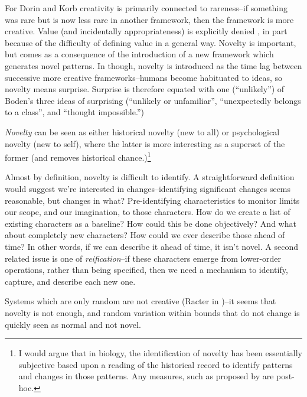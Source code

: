 \begin{NOTES}
\begin{mdframed}[style=box, frametitle={Creativity, and its relationship to Novelty, Surprise, and Value}]
For Dorin and Korb \cite{Dorin2009} creativity is primarily connected to rareness--if something was rare but is now less rare in another framework, then the framework is more creative. Value (and incidentally appropriateness) is explicitly denied \cite[p.18]{Dorin2009}, in part because of the difficulty of defining value in a general way. Novelty is important, but comes as a consequence of the introduction of a new framework which generates novel patterns. In \cite[p.16]{Dorin2009} though, novelty is introduced as the time lag between successive more creative frameworks--humans become habituated to ideas, so novelty means surprise. Surprise is therefore equated with one (``unlikely'') of Boden's three ideas of surprising (``unlikely or unfamiliar'', ``unexpectedly belongs to a class'', and ``thought impossible.'')

\emph{Novelty} can be seen as either historical novelty (new to all) or psychological novelty (new to self), where the latter is more interesting as a superset of the former (and removes historical chance.)\footnote{I would argue that in biology, the identification of novelty has been essentially subjective based upon a reading of the historical record to identify patterns and changes in those patterns. Any measures, such as proposed by \cite{McShea1998,Maynard-Smith:1995lw,Walker2012} are post-hoc.}

Almost by definition, novelty is difficult to identify. A straightforward definition would suggest we're interested in changes--identifying significant changes seems reasonable, but changes in what? Pre-identifying characteristics to monitor limits our scope, and our imagination, to those characters. How do we create a list of existing characters as a baseline? How could this be done objectively? And what about completely new characters? How could we ever describe those ahead of time? In other words, if we can describe it ahead of time, it isn't novel. A second related issue is one of \textit{reification}--if these characters emerge from lower-order operations, rather than being specified, then we need a mechanism to identify, capture, and describe each new one.

Systems which are only random are not creative (\eg Racter in \cite[p.16]{Dorin2009})--it seems that novelty is not enough, and random variation within bounds that do not change is quickly seen as normal and not novel. 


\end{mdframed}
\end{NOTES}
